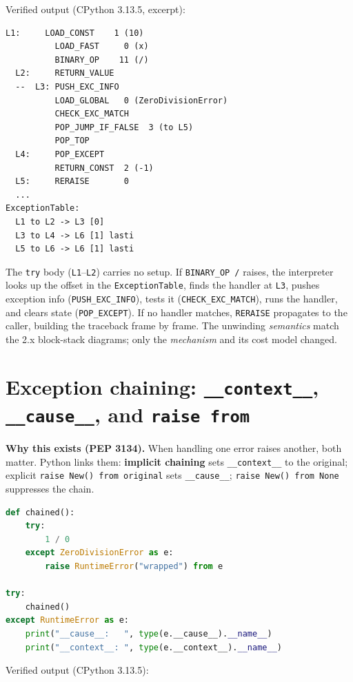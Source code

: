 Verified output (CPython 3.13.5, excerpt):

\begin{lstlisting}[caption={Output}]
  L1:     LOAD_CONST    1 (10)
          LOAD_FAST     0 (x)
          BINARY_OP    11 (/)
  L2:     RETURN_VALUE
  --  L3: PUSH_EXC_INFO
          LOAD_GLOBAL   0 (ZeroDivisionError)
          CHECK_EXC_MATCH
          POP_JUMP_IF_FALSE  3 (to L5)
          POP_TOP
  L4:     POP_EXCEPT
          RETURN_CONST  2 (-1)
  L5:     RERAISE       0
  ...
ExceptionTable:
  L1 to L2 -> L3 [0]
  L3 to L4 -> L6 [1] lasti
  L5 to L6 -> L6 [1] lasti
\end{lstlisting}

The \texttt{try} body (\texttt{L1}--\texttt{L2}) carries no setup. If \texttt{BINARY\_OP /}
raises, the interpreter looks up the offset in the \texttt{ExceptionTable}, finds the handler at
\texttt{L3}, pushes exception info (\texttt{PUSH\_EXC\_INFO}), tests it
(\texttt{CHECK\_EXC\_MATCH}), runs the handler, and clears state (\texttt{POP\_EXCEPT}). If no
handler matches, \texttt{RERAISE} propagates to the caller, building the traceback frame by frame.
The unwinding \emph{semantics} match the 2.x block-stack diagrams; only the \emph{mechanism} and
its cost model changed.

\section{Exception chaining: \texttt{\_\_context\_\_}, \texttt{\_\_cause\_\_}, and \texttt{raise from}}

\textbf{Why this exists (PEP 3134).} When handling one error raises another, both matter. Python
links them: \textbf{implicit chaining} sets \texttt{\_\_context\_\_} to the original; explicit
\texttt{raise New() from original} sets \texttt{\_\_cause\_\_}; \texttt{raise New() from None}
suppresses the chain.

\begin{lstlisting}[language=Python, caption={raise ... from ... sets \_\_cause\_\_; the original is also kept as \_\_context\_\_.}]
def chained():
    try:
        1 / 0
    except ZeroDivisionError as e:
        raise RuntimeError("wrapped") from e

try:
    chained()
except RuntimeError as e:
    print("__cause__:   ", type(e.__cause__).__name__)
    print("__context__: ", type(e.__context__).__name__)
\end{lstlisting}

Verified output (CPython 3.13.5):

